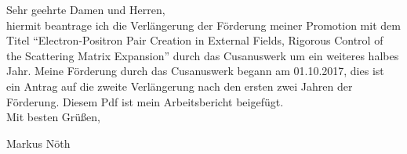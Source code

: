 \documentclass[a4paper,12pt]{article}
\begin{document}
Sehr geehrte Damen und Herren,\\

hiermit beantrage ich die Verlängerung der Förderung meiner Promotion mit dem Titel ``Electron-Positron Pair Creation in External Fields, 
Rigorous Control of the Scattering Matrix Expansion'' durch das Cusanuswerk um ein weiteres  halbes Jahr. 
Meine Förderung durch das Cusanuswerk begann am 01.10.2017, dies 
ist ein Antrag auf die zweite Verlängerung nach den ersten zwei Jahren der Förderung. Diesem Pdf ist mein Arbeitsbericht beigefügt.\\

Mit besten Grüßen,

Markus Nöth
\end{document}
